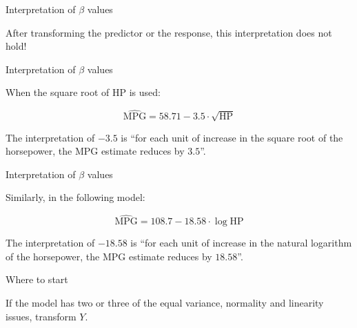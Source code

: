 \documentclass{beamer}\usepackage[]{graphicx}\usepackage[]{color}
\begin{document}
\begin{darkframes}
\begin{frame}[fragile]{Interpretation of $\beta$ values}
\begin{center}
        \alert{After transforming the predictor or the response, this interpretation does not hold!}
      
      \end{center}
    \end{frame}
  
  
  
  \begin{frame}[fragile]{Interpretation of $\beta$ values}

      \begin{center} 
        When the square root of HP is used: \bigskip
        
        \[
        \widehat{\text{MPG}} = 58.71 
        - 3.5 \cdot\sqrt{\text{HP}}
        
        \] \bigskip \pause
        
        The interpretation of $- 3.5$ is ``for each unit of increase \alert{in the square root of the horsepower}, the MPG estimate reduces by $ 3.5$''.
        
        \lc
        
      
      \end{center}
    \end{frame}
  
  
  \begin{frame}[fragile]{Interpretation of $\beta$ values}

      \begin{center} 
        Similarly, in the following model: \bigskip
        
        \[
        \widehat{\text{MPG}} = 108.7 
        - 18.58 \cdot\log{\text{HP}}
        
        \] \bigskip \pause
        
        The interpretation of $- 18.58$ is ``for each unit of increase \alert{in the natural logarithm of the horsepower}, the MPG estimate reduces by $ 18.58$''.
        
        \lc
        
      
      \end{center}
    \end{frame}
  
  
  
  
  
  
  
  
  
  
    \begin{frame}[fragile]{Where to start}
      \begin{center}
        If the model has two or three of the equal variance, normality and linearity issues, transform $Y$. \bigskip \pause
        

\end{center}
\end{frame}
\end{darkframes}
\end{document}
